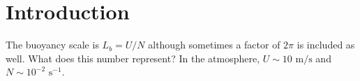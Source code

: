 \chapter{Introduction}

The buoyancy scale is $L_{b}=U/N$ although sometimes a factor of $2\pi$ is included as well. What does this number represent? In the atmosphere, $U\sim 10 \text{ m/s}$ and $N\sim 10^{-2} \text{ s}^{-1}$. 


